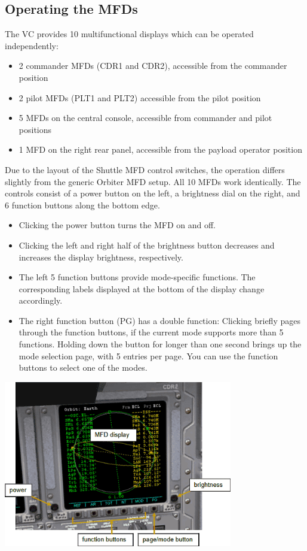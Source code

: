 \subsection{Operating the MFDs}
The VC provides 10 multifunctional displays which can be operated independently:
\begin{itemize}
\item 2 commander MFDs (CDR1 and CDR2), accessible from the commander position
\item 2 pilot MFDs (PLT1 and PLT2) accessible from the pilot position
\item 5 MFDs on the central console, accessible from commander and pilot positions
\item 1 MFD on the right rear panel, accessible from the payload operator position
\end{itemize}
Due to the layout of the Shuttle MFD control switches, the operation differs slightly from the generic Orbiter MFD setup. All 10 MFDs work identically. The controls consist of a power button on the left, a brightness dial on the right, and 6 function buttons along the bottom edge.
\begin{itemize} 
\item Clicking the power button turns the MFD on and off.
\item Clicking the left and right half of the brightness button decreases and increases the display brightness, respectively.
\item The left 5 function buttons provide mode-specific functions. The corresponding labels displayed at the bottom of the display change accordingly.
\item The right function button (PG) has a double function: Clicking briefly pages through the function buttons, if the current mode supports more than 5 functions. Holding down the button for longer than one second brings up the mode selection page, with 5 entries per page. You can use the function buttons to select one of the modes.
\end{itemize}
\begin{center}
\includegraphics[width=0.75\textwidth]{Images//Pic3.png}
\end{center}

